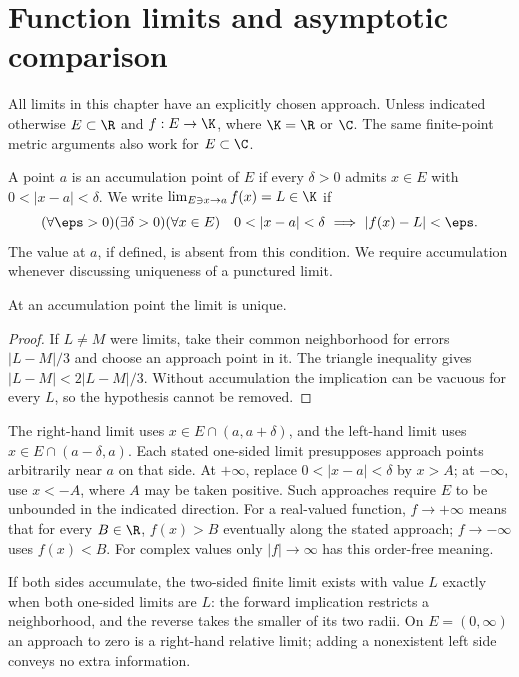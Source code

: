 \chapter{Function limits and asymptotic comparison}
All limits in this chapter have an explicitly chosen approach. Unless indicated otherwise $E\subset\R$ and $f:E\to\K$, where $\K=\R$ or $\C$. The same finite-point metric arguments also work for $E\subset\C$.

\begin{definition}
A point $a$ is an accumulation point of $E$ if every $\delta>0$ admits $x\in E$ with $0<|x-a|<\delta$. We write $\lim_{E\ni x\to a}f(x)=L\in\K$ if
\[ (\forall\eps>0)(\exists\delta>0)(\forall x\in E)\quad 0<|x-a|<\delta\ \Longrightarrow\ |f(x)-L|<\eps. \]
The value at $a$, if defined, is absent from this condition. We require accumulation whenever discussing uniqueness of a punctured limit.
\end{definition}
\begin{proposition}
At an accumulation point the limit is unique.
\end{proposition}
\begin{proof}
If $L\ne M$ were limits, take their common neighborhood for errors $|L-M|/3$ and choose an approach point in it. The triangle inequality gives $|L-M|<2|L-M|/3$. Without accumulation the implication can be vacuous for every $L$, so the hypothesis cannot be removed.
\end{proof}

\begin{definition}
The right-hand limit uses $x\in E\cap(a,a+\delta)$, and the left-hand limit uses $x\in E\cap(a-\delta,a)$. Each stated one-sided limit presupposes approach points arbitrarily near $a$ on that side. At $+\infty$, replace $0<|x-a|<\delta$ by $x>A$; at $-\infty$, use $x<-A$, where $A$ may be taken positive. Such approaches require $E$ to be unbounded in the indicated direction. For a real-valued function, $f\to+\infty$ means that for every $B\in\R$, $f(x)>B$ eventually along the stated approach; $f\to-\infty$ uses $f(x)<B$. For complex values only $|f|\to\infty$ has this order-free meaning.
\end{definition}
If both sides accumulate, the two-sided finite limit exists with value $L$ exactly when both one-sided limits are $L$: the forward implication restricts a neighborhood, and the reverse takes the smaller of its two radii. On $E=(0,\infty)$ an approach to zero is a right-hand relative limit; adding a nonexistent left side conveys no extra information.

